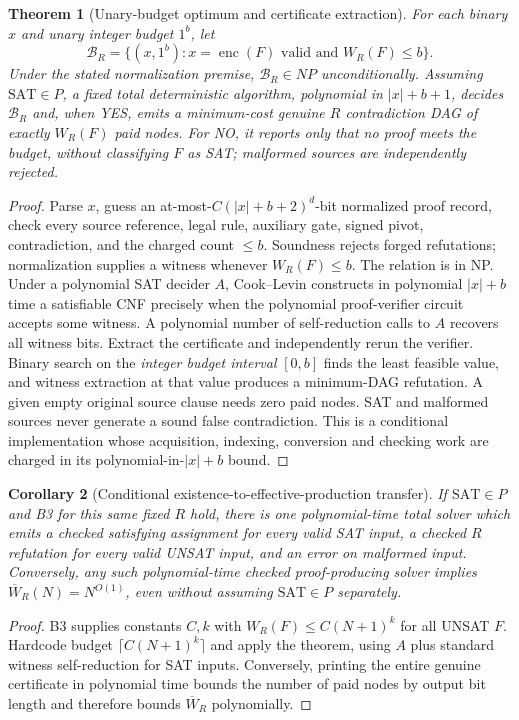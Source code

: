 \documentclass[11pt]{article}
\newtheorem{theorem}{Theorem}
\newtheorem{corollary}[theorem]{Corollary}
\begin{document}
\begin{theorem}[Unary-budget optimum and certificate extraction]
For each binary $x$ and unary integer budget $1^b$, let
\[
\mathcal B_R=\{(x,1^b):x=\operatorname{enc}(F)\text{ valid and }W_R(F)\le b\}.
\]
Under the stated normalization premise, $\mathcal B_R\in NP$ unconditionally. Assuming $\mathrm{SAT}\in P$, a fixed total deterministic algorithm, polynomial in $|x|+b+1$, decides $\mathcal B_R$ and, when YES, emits a \emph{minimum-cost} genuine $R$ contradiction DAG of exactly $W_R(F)$ paid nodes. For NO, it reports only that no proof meets the budget, without classifying $F$ as SAT; malformed sources are independently rejected.
\end{theorem}
\begin{proof}
Parse $x$, guess an at-most-$C(|x|+b+2)^d$-bit normalized proof record, check every source reference, legal rule, auxiliary gate, signed pivot, contradiction, and the charged count $\le b$. Soundness rejects forged refutations; normalization supplies a witness whenever $W_R(F)\le b$. The relation is in NP. Under a polynomial SAT decider $A$, Cook--Levin constructs in polynomial $|x|+b$ time a satisfiable CNF precisely when the polynomial proof-verifier circuit accepts some witness. A polynomial number of self-reduction calls to $A$ recovers all witness bits. Extract the certificate and independently rerun the verifier. Binary search on the \emph{integer budget interval} $[0,b]$ finds the least feasible value, and witness extraction at that value produces a minimum-DAG refutation. A given empty original source clause needs zero paid nodes. SAT and malformed sources never generate a sound false contradiction. This is a conditional implementation whose acquisition, indexing, conversion and checking work are charged in its polynomial-in-$|x|+b$ bound. \end{proof}

\begin{corollary}[Conditional existence-to-effective-production transfer]
If $\mathrm{SAT}\in P$ and B3 for this same fixed $R$ hold, there is one polynomial-time total solver which emits a checked satisfying assignment for every valid SAT input, a checked $R$ refutation for every valid UNSAT input, and an error on malformed input. Conversely, any such polynomial-time checked proof-producing solver implies $\overline W_R(N)=N^{O(1)}$, even without assuming $\mathrm{SAT}\in P$ separately.
\end{corollary}
\begin{proof}
B3 supplies constants $C,k$ with $W_R(F)\le C(N+1)^k$ for all UNSAT $F$. Hardcode budget $\lceil C(N+1)^k\rceil$ and apply the theorem, using $A$ plus standard witness self-reduction for SAT inputs. Conversely, printing the entire genuine certificate in polynomial time bounds the number of paid nodes by output bit length and therefore bounds $\overline W_R$ polynomially. \end{proof}
\end{document}
